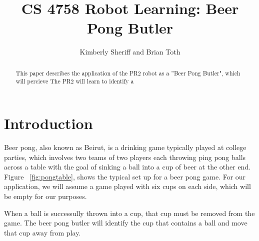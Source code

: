 \documentclass[letterpaper, 10 pt, conference]{ieeeconf}  %
\title{\LARGE \bf
CS 4758 Robot Learning: Beer Pong Butler
}
\author{Kimberly Sheriff and Brian Toth}
\begin{document}
\maketitle
\thispagestyle{empty}
\pagestyle{empty}


\begin{abstract}

This paper describes the application of the PR2 robot as a ''Beer Pong Butler", which will percieve  The PR2 will learn to identify a 

\end{abstract}


\section{Introduction}

Beer pong, also known as Beirut, is a drinking game typically played at college parties, which involves two teams of two players each throwing ping pong balls across a table with the goal of sinking a ball into a cup of beer at the other end. Figure ~\ref{fig:pongtable}, shows the typical set up for a beer pong game. For our application, we will assume a game played with six cups on each side, which will be empty for our purposes. 

When a ball is successully thrown into a cup, that cup must be removed from the game. The beer pong butler will identify the cup that contains a ball and move that cup away from play.
\end{document}
